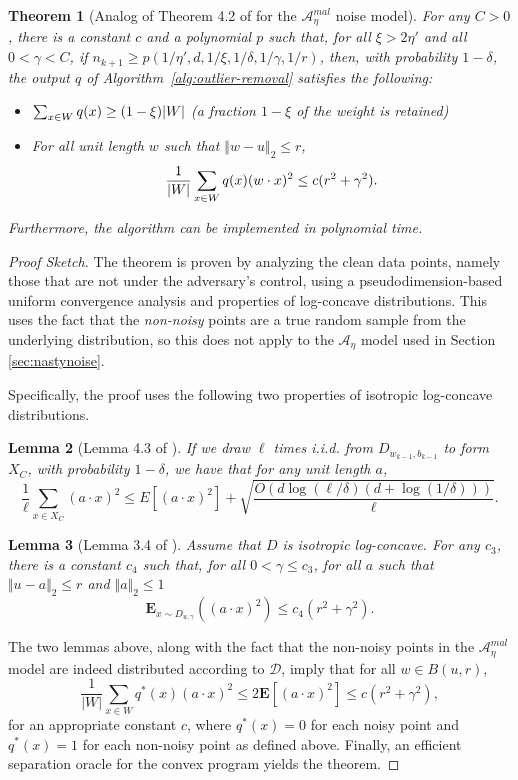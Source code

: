 \documentclass[11pt]{article}
\newcommand{\reg}{\color{black}}
\newtheorem{theorem}{Theorem}[section]
\newtheorem{lemma}[theorem]{Lemma}
\newcommand{\E}{\mathbf{E}}
\newcommand{\0}{\mathbf{0}}
\newcommand{\1}{\mathbf{1}}
\newcommand{\cA}{\mathcal{A}}
\newcommand{\cD}{\mathcal{D}}
\begin{document}
\setcounter{equation}{5}
\begin{theorem}[Analog of Theorem 4.2 of \cite{awasthi2017power} for the $\cA^{mal}_\eta$ noise model]
\label{thm:lopchop}
For any $C > 0$, there is a constant $c$ and a polynomial $p$ such that,
for all $\xi > 2 \eta'$ and all $0 < \gamma < C$,
if $n_{k+1} \geq
p(1/\eta', d, 1/\xi, 1/\delta,1/\gamma,1/r)$, then,
with probability $1 - \delta$, the output $q$ of Algorithm~\ref{alg:outlier-removal} satisfies the following:
\begin{itemize}
\item $\sum_{x \in {\reg W}} q(x) \geq (1 - \xi) |{\reg W}| $ (a fraction $1 - \xi$ of
the weight is retained)
\item For all unit length $w$ such that $\Vert w-u \Vert_2 \le r$,
\begin{equation}
\label{e:lopchop.varbound}
\frac{1}{\reg |W|} \sum_{x \in {\reg W}} q(x) (w \cdot x)^2
   \leq c (r^2 + \gamma^2).
\end{equation}
\end{itemize}
Furthermore, the algorithm can be implemented in polynomial time.
\end{theorem}
\begin{proof}[Proof Sketch]
The theorem is proven by analyzing the clean data points, namely those that are not under the adversary's control, using a pseudodimension-based uniform convergence analysis and properties of log-concave distributions. This uses the fact that the {\em non-noisy} points are a true random sample from the underlying distribution, so this does not apply to the $\cA_\eta$ model used in Section \ref{sec:nastynoise}.

Specifically, the proof uses the following two properties of isotropic log-concave distributions.
\begin{lemma}[Lemma 4.3 of \cite{awasthi2017power}]
\label{lemma:all.var}
If we draw $\ell$ times i.i.d. from
$D_{w_{k-1}, b_{k-1}}$ to form $X_C$, with probability $1 - \delta$, we have that for
any unit length $a$,
\[
\frac{1}{\ell} \sum_{x \in X_C} (a \cdot x)^2
   \leq E[(a\cdot x)^2]
       +  \sqrt{\frac{O(d \log(\ell/\delta) (d + \log (1/\delta)))}{\ell}}.
\]
\end{lemma}

\begin{lemma}[Lemma 3.4 of \cite{awasthi2017power}]
\label{lemma:var.small}
Assume that $D$ is isotropic log-concave.
For any $c_3$, there is a constant $c_4$ such that, for
all $0 < \gamma \leq c_3$,
for all $a$ such that $\Vert u-a \Vert_2 \le r$ and $\Vert a \Vert_2 \le 1$
\[
\E_{x \sim D_{u,\gamma}} ((a \cdot x)^2)
  \leq c_4 (r^2 + \gamma^2) .
\]
\end{lemma}
\noindent
The two lemmas above, along with the fact that the non-noisy points in the $\cA^{mal}_\eta$ model are indeed distributed according to $\cD$, imply that for all
$w \in B(u,r)$,
\[
\frac{1}{|W|} \sum_{x \in W} q^*(x) (a \cdot x)^2
  \leq 2 \E[(a \cdot x)^2]
 \leq c (r^2 + \gamma^2),
\]
for an appropriate constant $c$, where  $q^*(x)=0$ for each noisy point and $q^*(x)=1$ for each non-noisy point as defined above.  Finally, an efficient separation oracle for the convex program yields the theorem.
\end{proof}
\end{document}
